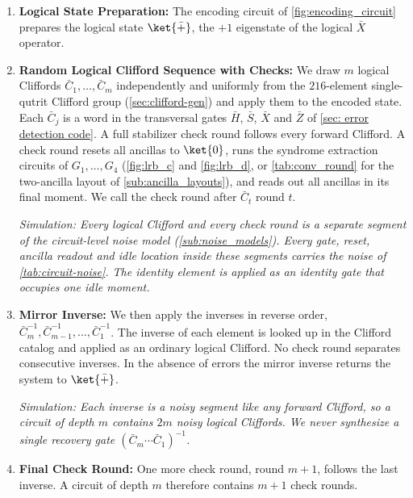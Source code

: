 \begin{enumerate}
    \item \textbf{Logical State Preparation:} The encoding circuit of \autoref{fig:encoding_circuit} prepares the logical state $\ket{\bar{+}}$, the $+1$ eigenstate of the logical $\bar{X}$ operator.

    \item \textbf{Random Logical Clifford Sequence with Checks:} We draw $m$ logical Cliffords $\bar C_1, \dots, \bar C_m$ independently and uniformly from the $216$-element single-qutrit Clifford group (\autoref{sec:clifford-gen}) and apply them to the encoded state. Each $\bar C_j$ is a word in the transversal gates $\bar H$, $\bar S$, $\bar X$ and $\bar Z$ of \autoref{sec: error detection code}. A full stabilizer check round follows every forward Clifford. A check round resets all ancillas to $\ket{0}$, runs the syndrome extraction circuits of $G_1, \dots, G_4$ (\autoref{fig:lrb_c} and \autoref{fig:lrb_d}, or \autoref{tab:conv_round} for the two-ancilla layout of \autoref{sub:ancilla_layouts}), and reads out all ancillas in its final moment. We call the check round after $\bar C_t$ round $t$.

    \textit{Simulation: Every logical Clifford and every check round is a separate segment of the circuit-level noise model (\autoref{sub:noise_models}). Every gate, reset, ancilla readout and idle location inside these segments carries the noise of \autoref{tab:circuit-noise}. The identity element is applied as an identity gate that occupies one idle moment.}

    \item \textbf{Mirror Inverse:} We then apply the inverses in reverse order, $\bar C_m^{-1}, \bar C_{m-1}^{-1}, \dots, \bar C_1^{-1}$. The inverse of each element is looked up in the Clifford catalog and applied as an ordinary logical Clifford. No check round separates consecutive inverses. In the absence of errors the mirror inverse returns the system to $\ket{\bar{+}}$.

    \textit{Simulation: Each inverse is a noisy segment like any forward Clifford, so a circuit of depth $m$ contains $2m$ noisy logical Cliffords. We never synthesize a single recovery gate $(\bar C_m \cdots \bar C_1)^{-1}$.}

    \item \textbf{Final Check Round:} One more check round, round $m+1$, follows the last inverse. A circuit of depth $m$ therefore contains $m+1$ check rounds.


\end{enumerate}
